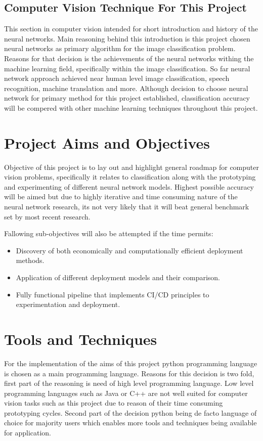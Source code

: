 \documentclass[12pt, twoside, a4paper]{article}
\begin{document}
\subsection{Computer Vision Technique For This Project}
This section in computer vision intended for short introduction and history of the neural networks. Main reasoning behind this introduction is this project chosen neural networks as primary algorithm for the image classification problem. Reasons for that decision is the achievements of the neural networks withing the machine learning field, specifically within the image classification. So far neural network approach achieved near human level image classification, speech recognition, machine translation and more. Although decision to choose neural network for primary method for this project established, classification accuracy will be compered with other machine learning techniques throughout this project.
\clearpage

\section{Project Aims and Objectives}
\indent Objective of this project is to lay out and highlight general roadmap for computer vision problems, specifically it relates to classification along with the prototyping and experimenting of different neural network models. Highest possible accuracy will be aimed but due to highly iterative and time consuming nature of the neural network research, its not very likely that it will beat general benchmark set by most recent research.

Fallowing sub-objectives will also be attempted if the time permits:
\begin{itemize}
    \item Discovery of both economically and computationally efficient deployment methods.
    \item Application of different deployment models and their comparison.
    \item Fully functional pipeline that implements CI/CD principles to experimentation and deployment.
\end{itemize}
\clearpage

\section{Tools and Techniques}
For the implementation of the aims of this project python programming language is chosen as a main programming language. Reasons for this decision is two fold, first part of the reasoning is need of high level programming language. Low level programming languages such as Java or C++ are not well suited for computer vision tasks such as this project due to reason of their time consuming prototyping cycles. Second part of the decision python being de facto language of choice for majority users which enables more tools and techniques being available for application. 
\end{document}
